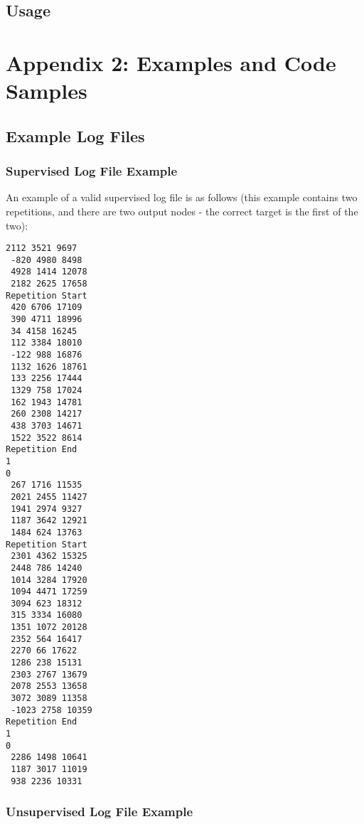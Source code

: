 \documentclass[a4paper]{article}
\begin{document}

\subsection{Usage}%


\section{Appendix 2: Examples and Code Samples}

\subsection{Example Log Files}%

\subsubsection{Supervised Log File Example}

An example of a valid supervised log file is as follows (this example contains two repetitions, and there are two output nodes - the correct target is the first of the two):

\begin{lstlisting}
2112 3521 9697
 -820 4980 8498
 4928 1414 12078
 2182 2625 17658
Repetition Start
 420 6706 17109
 390 4711 18996
 34 4158 16245
 112 3384 18010
 -122 988 16876
 1132 1626 18761
 133 2256 17444
 1329 758 17024
 162 1943 14781
 260 2308 14217
 438 3703 14671
 1522 3522 8614
Repetition End
1
0
 267 1716 11535
 2021 2455 11427
 1941 2974 9327
 1187 3642 12921
 1484 624 13763
Repetition Start
 2301 4362 15325
 2448 786 14240
 1014 3284 17920
 1094 4471 17259
 3094 623 18312
 315 3334 16080
 1351 1072 20128
 2352 564 16417
 2270 66 17622
 1286 238 15131
 2303 2767 13679
 2078 2553 13658
 3072 3089 11358
 -1023 2758 10359
Repetition End
1
0
 2286 1498 10641
 1187 3017 11019
 938 2236 10331
\end{lstlisting}

\subsubsection{Unsupervised Log File Example}
\end{document}
